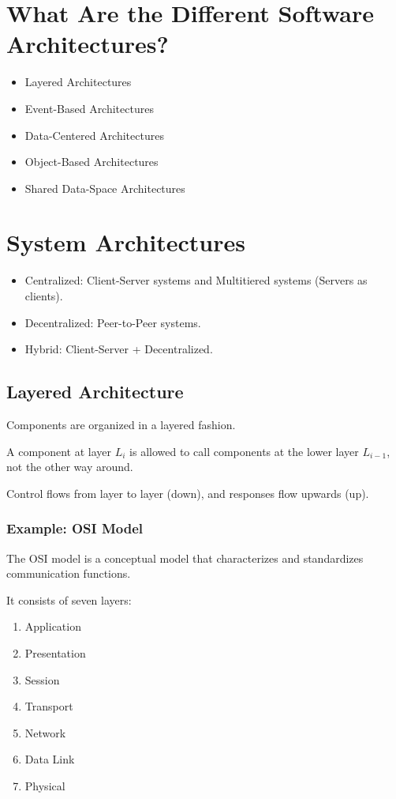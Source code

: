 \documentclass{article}
\begin{document}
\section{What Are the Different Software Architectures?}

\begin{itemize}
    \item Layered Architectures
    \item Event-Based Architectures
    \item Data-Centered Architectures
    \item Object-Based Architectures
    \item Shared Data-Space Architectures
\end{itemize}

\section{System Architectures}

\begin{itemize}
    \item Centralized: Client-Server systems and Multitiered systems (Servers as clients).
    \item Decentralized: Peer-to-Peer systems.
    \item Hybrid: Client-Server + Decentralized.
\end{itemize}

\subsection{Layered Architecture}

Components are organized in a layered fashion.

A component at layer $L_i$ is allowed to call components at the lower layer $L_{i-1}$, not the other way around.

Control flows from layer to layer (down), and responses flow upwards (up).

\subsubsection{Example: OSI Model}

The OSI model is a conceptual model that characterizes and standardizes communication functions.

It consists of seven layers:

\begin{enumerate}
    \item Application
    \item Presentation
    \item Session
    \item Transport
    \item Network
    \item Data Link
    \item Physical
\end{enumerate}
\end{document}
